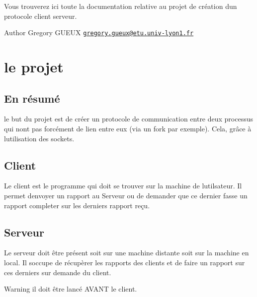 Vous trouverez ici toute la documentation relative au projet de création d\textquotesingle{}un protocole client serveur.\begin{DoxyAuthor}{Author}
Gregory G\+U\+E\+U\+X \href{mailto:gregory.gueux@etu.univ-lyon1.fr}{\tt gregory.\+gueux@etu.\+univ-\/lyon1.\+fr}
\end{DoxyAuthor}
\hypertarget{index_sec1}{}\section{le projet}\label{index_sec1}
\hypertarget{index_sub11}{}\subsection{En résumé}\label{index_sub11}
le but du projet est de créer un protocole de communication entre deux processus qui n\textquotesingle{}ont pas forcément de lien entre eux (via un fork par exemple). Cela, grâce à l\textquotesingle{}utilisation des sockets.\hypertarget{index_sub12}{}\subsection{Client}\label{index_sub12}
Le client est le programme qui doit se trouver sur la machine de l\textquotesingle{}utilsateur. Il permet d\textquotesingle{}envoyer un rapport au Serveur ou de demander que ce dernier fasse un rapport completer sur les derniers rapport reçu.\hypertarget{index_sub13}{}\subsection{Serveur}\label{index_sub13}
Le serveur doit être présent soit sur une machine distante soit sur la machine en local. Il s\textquotesingle{}occupe de récupèrer les rapports des clients et de faire un rapport sur ces derniers sur demande du client. \begin{DoxyWarning}{Warning}
il doit être lancé A\+V\+A\+N\+T le client. 
\end{DoxyWarning}
